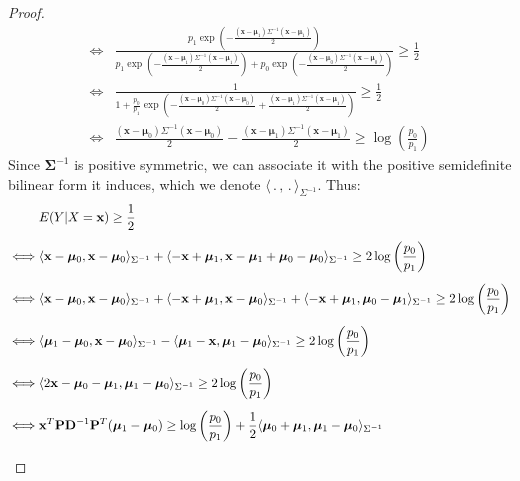 \documentclass[preprint,12pt]{elsarticle}
\begin{document}
\begin{proof}
\begin{align}
     \iff  & \frac{p_1\exp \left( -\frac{(\mathbf{x} - \bm{\mu}_1)\Sigma^{-1}(\mathbf{x} - \bm{\mu}_1)}{2} \right)}{p_1\exp\left(  -\frac{(\mathbf{x} - \bm{\mu}_1)\Sigma^{-1}(\mathbf{x} - \bm{\mu}_1)}{2}\right) + p_0\exp\left( -\frac{(\mathbf{x} - \bm{\mu}_0)\Sigma^{-1}(\mathbf{x} - \bm{\mu}_0)}{2}\right)} \geq \frac{1}{2}\\[5 pt]
    \iff & \frac{1}{1 + \frac{p_0}{p_1}\exp\left( -\frac{(\mathbf{x} - \bm{\mu}_0)\Sigma^{-1}(\mathbf{x} - \bm{\mu}_0)}{2} + \frac{(\mathbf{x} - \bm{\mu}_1)\Sigma^{-1}(\mathbf{x} - \bm{\mu}_1)}{2}\right)} \geq \frac{1}{2}\\[5 pt]
    \iff & \frac{(\mathbf{x}- \bm{\mu}_0)\Sigma^{-1}(\mathbf{x} - \bm{\mu}_0)}{2} - \frac{(\mathbf{x} - \bm{\mu}_1)\Sigma^{-1}(\mathbf{x} - \bm{\mu}_1)}{2} \geq \log\left(\frac{p_0}{p_1} \right)
\end{align}
Since $\bm{\Sigma}^{-1}$ is positive symmetric, we can associate it with the positive semidefinite bilinear form it induces, which we denote $\langle \, . \,,\, . \,\rangle_{\Sigma^{-1}}$. Thus:
\begin{align}
    & E(Y|X = \mathbf{x}) \geq \frac{1}{2} \hspace{2 cm} \phantom{2} \\[5 pt]
    \iff & \langle \mathbf{x}- \bm{\mu}_0, \mathbf{x}- \bm{\mu}_0\rangle_{\Sigma^{-1}} + \langle -\mathbf{x} + \bm{\mu}_1 , \mathbf{x} - \bm{\mu}_1 + \bm{\mu}_0 - \bm{\mu}_0\rangle_{\Sigma^{-1}} \geq 2\log\left(\frac{p_0}{p_1} \right) \\[5 pt]
    \iff & \langle \mathbf{x}- \bm{\mu}_0, \mathbf{x}- \bm{\mu}_0\rangle_{\Sigma^{-1}} + \langle - \mathbf{x} + \bm{\mu}_1, \mathbf{x}- \bm{\mu}_0\rangle_{\Sigma^{-1}} + \langle -\mathbf{x} + \bm{\mu}_1 , \bm{\mu}_0 - \bm{\mu}_1 \rangle_{\Sigma^{-1}} \geq 2\log\left(\frac{p_0}{p_1} \right) \\[5 pt]
    \iff & \langle \bm{\mu}_1 - \bm{\mu}_0 , \mathbf{x} - \bm{\mu}_0 \rangle_{\Sigma^{-1}} - \langle \bm{\mu}_1 - \mathbf{x}, \bm{\mu}_1 - \bm{\mu}_0\rangle_{\Sigma^{-1}} \geq 2\log\left(\frac{p_0}{p_1} \right) \hspace{-0.5 cm} \phantom{2}\\[5 pt]
    \iff & \langle 2\mathbf{x} - \bm{\mu}_0 - \bm{\mu}_1, \bm{\mu}_1 - \bm{\mu}_0 \rangle_{\Sigma^{-1}} \geq 2\log\left(\frac{p_0}{p_1} \right) \hspace{-0.5 cm} \phantom{2} \\[5 pt]
    \iff & \mathbf{x}^T\mathbf{P}\mathbf{D}^{-1}\mathbf{P}^T(\bm{\mu}_1 - \bm{\mu}_0) \geq \log\left(\frac{p_0}{p_1} \right) + \frac{1}{2}\langle \bm{\mu}_0 + \bm{\mu}_1 , \bm{\mu}_1 - \bm{\mu}_0\rangle_{\Sigma^{-1}} \hspace{-0.5 cm} \phantom{2} \\[5 pt]

\end{align}
\end{proof}
\end{document}
